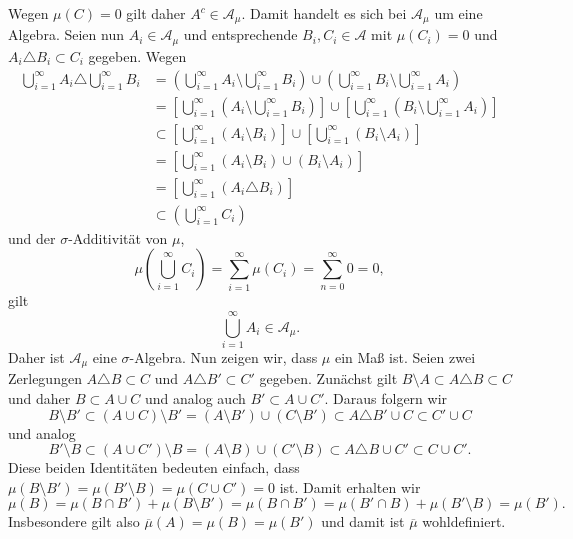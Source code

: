 \documentclass{article}
\begin{document}
    Wegen $\mu(C) = 0$ gilt daher $A^c \in \mathcal{A}_\mu$.
    Damit handelt es sich bei $\mathcal{A}_\mu$ um eine Algebra.
    Seien nun $A_i \in \mathcal{A}_\mu$ und entsprechende $B_i, C_i \in \mathcal{A}$ mit $\mu(C_i) = 0$ und $A_i \triangle B_i \subset C_i$ gegeben. 
    Wegen
    \begin{align*}
        \bigcup_{i = 1}^\infty A_i \triangle \bigcup_{i=1}^\infty B_i &= \left( \bigcup_{i = 1}^\infty A_i\setminus \bigcup_{i=1}^\infty B_i\right) \cup \left(\bigcup_{i=1}^\infty B_i \setminus \bigcup_{i=1}^\infty A_i\right)\\
        &=  \left[ \bigcup_{i = 1}^\infty \left(A_i\setminus \bigcup_{i=1}^\infty B_i\right)\right] \cup \left[\bigcup_{i=1}^\infty \left(B_i \setminus \bigcup_{i=1}^\infty A_i\right)\right]\\
        &\subset \left[ \bigcup_{i = 1}^\infty \left(A_i\setminus B_i\right)\right] \cup \left[\bigcup_{i=1}^\infty \left(B_i \setminus A_i\right)\right]\\
        &= \left[ \bigcup_{i = 1}^\infty \left(A_i\setminus B_i\right) \cup \left(B_i \setminus A_i\right)\right]\\
        &= \left[ \bigcup_{i = 1}^\infty \left(A_i\triangle B_i\right)\right]\\
        &\subset \left( \bigcup_{i=1}^\infty C_i\right)
    \end{align*}
    und der $\sigma$-Additivität von $\mu$, \[\mu\left( \bigcup_{i=1}^\infty C_i\right) = \sum_{i = 1}^{\infty} \mu(C_i) = \sum_{n = 0}^{\infty} 0 = 0,\] gilt \[\bigcup_{i = 1}^\infty A_i \in \mathcal{A}_\mu.\]
    Daher ist $\mathcal{A}_\mu$ eine $\sigma$-Algebra.
    Nun zeigen wir, dass $\mu$ ein Maß ist.
    Seien zwei Zerlegungen $A\triangle B \subset C$ und $A\triangle B' \subset C'$ gegeben.
    Zunächst gilt $B \setminus A \subset A\triangle B \subset C$ und daher $B \subset A \cup C$ und analog auch $B' \subset A \cup C'$. Daraus folgern wir
    \[
        B \setminus B' \subset (A\cup C)\setminus B' = (A \setminus B') \cup (C\setminus B') \subset A\triangle B' \cup C \subset C' \cup C
    \]
    und analog
    \[
        B' \setminus B \subset (A\cup C')\setminus B = (A \setminus B) \cup (C'\setminus B) \subset A\triangle B \cup C' \subset C \cup C'.
    \]
    Diese beiden Identitäten bedeuten einfach, dass $\mu(B \setminus B') = \mu(B'\setminus B) = \mu(C\cup C') = 0$ ist.
    Damit erhalten wir
    \[
        \mu(B) = \mu(B \cap B') + \mu(B \setminus B') = \mu(B \cap B') = \mu(B' \cap B) + \mu(B'\setminus B) = \mu(B').
    \]
    Insbesondere gilt also $\overline{\mu}(A) = \mu(B) = \mu(B')$ und damit ist $\overline{\mu}$ wohldefiniert.
\end{document}
